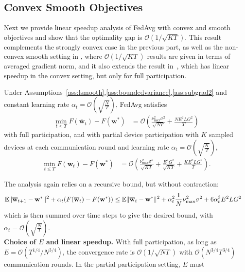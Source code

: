 \subsection{Convex Smooth Objectives}
Next we provide linear speedup analysis of FedAvg with convex and
smooth objectives and show that the optimality gap is $\mathcal{O}(1/\sqrt{KT})$. 
This result complements the strongly convex case in the previous part, as well as the non-convex
smooth setting in \cite{jiang2018linear,yu2019parallel,haddadpour2019convergence},
where $\mathcal{O}(1/\sqrt{KT})$ results are given in terms of averaged
gradient norm, and it also extends the result in~\cite{khaled2020tighter}, which has linear speedup in the convex setting, but only for full participation.
\begin{theorem}
	\label{thm:SGD_cvx}Under Assumptions~\ref{ass:lsmooth},\ref{ass:boundedvariance},\ref{ass:subgrad2} and constant learning
	rate $\alpha_{t}=\mathcal{O}(\sqrt{\frac{N}{T}})$, FedAvg satisfies
	\begin{align*}
	\min_{t\leq T}F(\overline{\mathbf{w}}_{t})-F(\mathbf{w}^{\ast}) & =\mathcal{O}\left(\frac{\nu_{\max}^{2}\sigma^{2}}{\sqrt{NT}}+\frac{NE^{2}LG^{2}}{T}\right)
	\end{align*}
	with full participation, and with partial device participation with $K$ sampled devices at
	each communication round and learning rate $\alpha_{t}=\mathcal{O}(\sqrt{\frac{K}{T}})$,
	\begin{align*}
	\min_{t\leq T}F(\overline{\mathbf{w}}_{t})-F(\mathbf{w}^{\ast}) & =\mathcal{O}\left(\frac{\nu_{\max}^{2}\sigma^{2}}{\sqrt{KT}}+\frac{E^{2}G^{2}}{\sqrt{KT}}+\frac{KE^{2}LG^{2}}{T}\right).
	\end{align*}
\end{theorem}
The analysis again relies on a recursive bound, but without contraction: 
\begin{align*}
	\mathbb{E}\|{\overline{\mathbf{w}}}_{t+1}-{\mathbf{w}}^{\ast}\|^{2}+\alpha_{t}(F({\overline{\mathbf{w}}}_{t})-F({\mathbf{w}}^{\ast})) & \leq \mathbb{E}\|{\overline{\mathbf{w}}}_{t}-{\mathbf{w}}^{\ast}\|^{2}+\alpha_{t}^{2}\frac{1}{N}\nu_{\max}^{2}\sigma^{2}+6\alpha_{t}^{3}E^{2}LG^{2}
	\end{align*}
which is then summed over time steps to give the desired bound, with $\alpha_{t}=\mathcal{O}(\sqrt{\frac{N}{T}})$. \\
%
\textbf{Choice of $E$ and linear speedup. }With full participation,
as long as $E=\mathcal{O}(T^{1/4}/N^{3/4})$, the convergence
rate is $\mathcal{O}(1/\sqrt{NT})$ with $\mathcal{O}(N^{3/4}T^{3/4})$
communication rounds. In the partial participation setting, $E$ must
